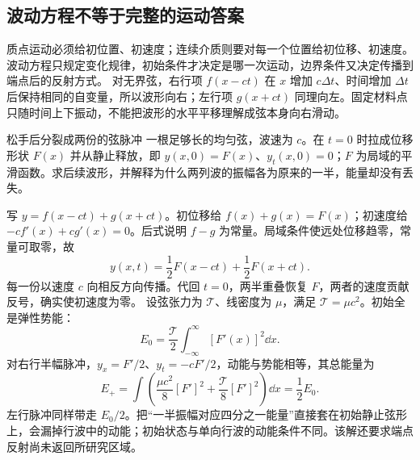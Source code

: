 \subsection{波动方程不等于完整的运动答案}
质点运动必须给初位置、初速度；连续介质则要对每一个位置给初位移、初速度。波动方程只规定变化规律，初始条件才决定是哪一次运动，边界条件又决定传播到端点后的反射方式。
对无界弦，右行项 $f(x-ct)$ 在 $x$ 增加 $c\Delta t$、时间增加 $\Delta t$ 后保持相同的自变量，所以波形向右；左行项 $g(x+ct)$ 同理向左。固定材料点只随时间上下振动，不能把波形的水平平移理解成弦本身向右滑动。

\begin{origexamplebox}{松手后分裂成两份的弦脉冲}\label{ch12:ex:teaching-initial-pulse}
一根足够长的均匀弦，波速为 $c$。在 $t=0$ 时拉成位移形状 $F(x)$ 并从静止释放，即 $y(x,0)=F(x)$、$y_t(x,0)=0$；$F$ 为局域的平滑函数。求后续波形，并解释为什么两列波的振幅各为原来的一半，能量却没有丢失。
\end{origexamplebox}
\begin{xesolution}
写 $y=f(x-ct)+g(x+ct)$。初位移给 $f(x)+g(x)=F(x)$；初速度给 $-cf'(x)+cg'(x)=0$。后式说明 $f-g$ 为常量。局域条件使远处位移趋零，常量可取零，故
\[
 y(x,t)=\frac12F(x-ct)+\frac12F(x+ct).
\]
每一份以速度 $c$ 向相反方向传播。代回 $t=0$，两半重叠恢复 $F$，两者的速度贡献反号，确实使初速度为零。
设弦张力为 $\mathcal T$、线密度为 $\mu$，满足 $\mathcal T=\mu c^2$。初始全是弹性势能：
\[
 E_0=\frac{\mathcal T}{2}\int_{-\infty}^{\infty}[F'(x)]^2\dd x.
\]
对右行半幅脉冲，$y_x=F'/2$、$y_t=-cF'/2$，动能与势能相等，其总能量为
\[
 E_+=\int\left(\frac{\mu c^2}{8}[F']^2+
 \frac{\mathcal T}{8}[F']^2\right)\dd x=\frac12E_0.
\]
左行脉冲同样带走 $E_0/2$。把“一半振幅对应四分之一能量”直接套在初始静止弦形上，会漏掉行波中的动能；初始状态与单向行波的动能条件不同。该解还要求端点反射尚未返回所研究区域。
\end{xesolution}
